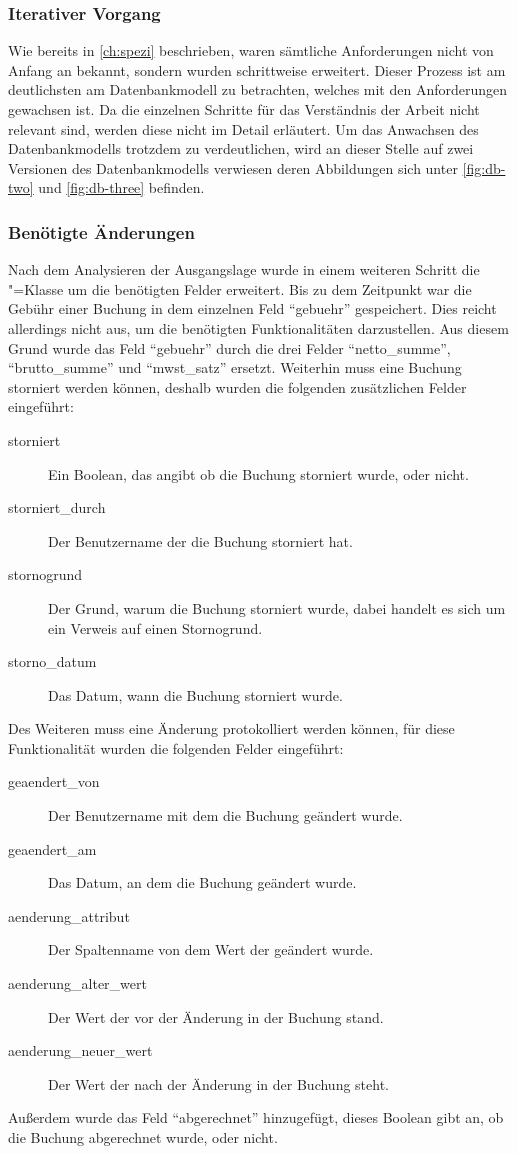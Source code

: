 \subsubsection{Iterativer Vorgang}
Wie bereits in \autoref{ch:spezi} beschrieben, waren sämtliche Anforderungen nicht von Anfang an bekannt, sondern wurden schrittweise erweitert.
Dieser Prozess ist am deutlichsten am Datenbankmodell zu betrachten, welches mit den Anforderungen gewachsen ist.
Da die einzelnen Schritte für das Verständnis der Arbeit nicht relevant sind, werden diese nicht im Detail erläutert.
Um das Anwachsen des Datenbankmodells trotzdem zu verdeutlichen, wird an dieser Stelle auf zwei Versionen des Datenbankmodells verwiesen deren Abbildungen sich unter \ref{fig:db-two} und \ref{fig:db-three} befinden.

\subsubsection{Benötigte Änderungen}
Nach dem Analysieren der Ausgangslage wurde in einem weiteren Schritt die "=Klasse um die benötigten Felder erweitert.
Bis zu dem Zeitpunkt war die Gebühr einer Buchung in dem einzelnen Feld "`gebuehr"' gespeichert.
Dies reicht allerdings nicht aus, um die benötigten Funktionalitäten darzustellen. Aus diesem Grund wurde das Feld  "`gebuehr"' durch die drei Felder "`netto\_summe"', "`brutto\_summe"' und "`mwst\_satz"' ersetzt.
Weiterhin muss eine Buchung storniert werden können, deshalb wurden die folgenden zusätzlichen Felder eingeführt:
\begin{description}
\item[storniert] Ein Boolean, das angibt ob die Buchung storniert wurde, oder nicht.
\item[storniert\_durch] Der Benutzername der die Buchung storniert hat.
\item[stornogrund] Der Grund, warum die Buchung storniert wurde, dabei handelt es sich um ein Verweis auf einen Stornogrund.
\item[storno\_datum] Das Datum, wann die Buchung storniert wurde.
\end{description}
Des Weiteren muss eine Änderung protokolliert werden können, für diese Funktionalität wurden die folgenden Felder eingeführt:
\begin{description}
\item[geaendert\_von] Der Benutzername mit dem die Buchung geändert wurde.
\item[geaendert\_am] Das Datum, an dem die Buchung geändert wurde.
\item[aenderung\_attribut] Der Spaltenname von dem Wert der geändert wurde.
\item[aenderung\_alter\_wert] Der Wert der vor der Änderung in der Buchung stand.
\item[aenderung\_neuer\_wert] Der Wert der nach der Änderung in der Buchung steht.
\end{description}
Außerdem wurde das Feld "`abgerechnet"' hinzugefügt, dieses Boolean gibt an, ob die Buchung abgerechnet wurde, oder nicht.

